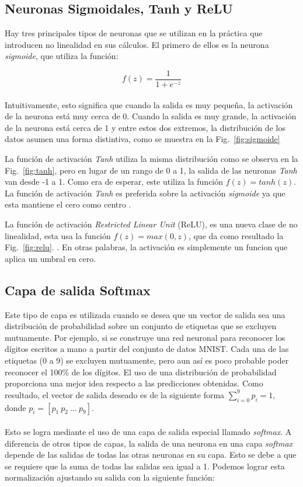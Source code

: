     \subsection{Neuronas Sigmoidales, Tanh y ReLU}

    Hay tres principales tipos de neuronas que se utilizan en la práctica que introducen no linealidad en sus cálculos. El primero de ellos es la neurona \textit{sigmoide}, que utiliza la función:

    \begin{equation}
        f(z)=\frac{1}{1+e^{-z}}
    \end{equation}
    \\
    Intuitivamente, esto significa que cuando la salida es muy pequeña, la activación de la neurona está muy cerca de 0. Cuando la salida es muy grande, la activación de la neurona está cerca de 1 y entre estos dos extremos, la distribución de los datos asumen una forma distintiva, como se muestra en la Fig.~\ref{fig:sigmoide}
   

    La función de activación \textit{Tanh} utiliza la misma distribución como se observa en la Fig.~\ref{fig:tanh}, pero en lugar de un rango de 0 a 1, la salida de las neuronas \textit{Tanh} van desde -1 a 1. Como era de esperar, este utiliza la función $f(z)=tanh(z)$. La función de activación \textit{Tanh} es preferida sobre la activación \textit{sigmoide} ya que esta mantiene el cero como centro \cite{dlBook}.
 
    La función de activación \textit{Restricted Linear Unit} (ReLU), es una nueva clase de no linealidad, esta usa la función $f(z)=max(0,z)$, que da como resultado la Fig.~\ref{fig:relu}.  \cite{dlBook}. En otras palabras, la activación es simplemente un funcion que aplica un umbral en cero.
 

    \subsection{Capa de salida Softmax}

    Este tipo de capa es utilizada cuando se desea que un vector de salida sea una distribución de probabilidad sobre un conjunto de etiquetas que se excluyen mutuamente. Por ejemplo, si se construye una red neuronal para reconocer los dígitos escritos a mano a partir del conjunto de datos MNIST. Cada una de las etiquetas (0 a 9) se excluyen mutuamente, pero aun así es poco probable poder reconocer el 100\% de los dígitos. El uso de una distribución de probabilidad proporciona una mejor idea respecto a las predicciones obtenidas. Como resultado, el vector de salida deseado es de la siguiente forma $\sum_{i=0}^9 p_i=1$, donde $p_i=[p_1\ p_2\ ...\ p_9]$.
    \\\\
    Esto se logra mediante el uso de una capa de salida especial llamado \textit{softmax}. A diferencia de otros tipos de capas, la salida de una neurona en una capa \textit{softmax} depende de las salidas de todas las otras neuronas en su capa. Esto se debe a que se requiere que la suma de todas las salidas sea igual a 1. Podemos lograr esta normalización ajustando su salida con la siguiente función:

